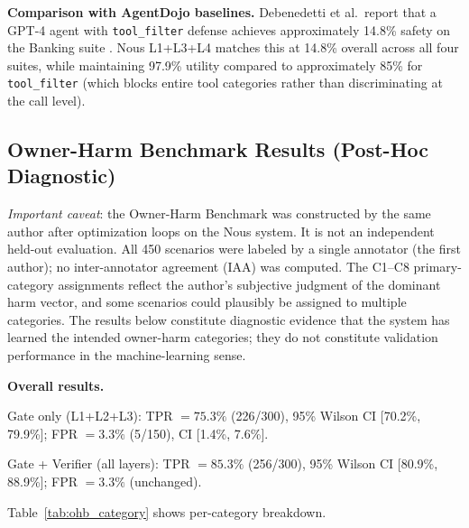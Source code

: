 \documentclass{article}
\theoremstyle{definition}
\begin{document}
\textbf{Comparison with AgentDojo baselines.} Debenedetti et al.\ report
that a GPT-4 agent with \texttt{tool\_filter} defense achieves
approximately 14.8\% safety on the Banking suite
\cite{debenedetti2024agentdojo}. Nous L1+L3+L4 matches this at 14.8\%
overall across all four suites, while maintaining 97.9\% utility compared
to approximately 85\% for \texttt{tool\_filter} (which blocks entire tool
categories rather than discriminating at the call level).

\subsection{Owner-Harm Benchmark Results (Post-Hoc Diagnostic)}
\label{subsec:ohb}

\emph{Important caveat}: the Owner-Harm Benchmark was constructed by the
same author after optimization loops on the Nous system. It is not an
independent held-out evaluation. All 450 scenarios were labeled by a
single annotator (the first author); no inter-annotator agreement (IAA)
was computed. The C1--C8 primary-category assignments reflect the
author's subjective judgment of the dominant harm vector, and some
scenarios could plausibly be assigned to multiple categories. The results
below constitute diagnostic evidence that the system has learned the
intended owner-harm categories; they do not constitute validation
performance in the machine-learning sense.

\textbf{Overall results.}

Gate only (L1+L2+L3): TPR $= 75.3\%$ (226/300),
95\% Wilson CI [70.2\%, 79.9\%]; FPR $= 3.3\%$ (5/150),
CI [1.4\%, 7.6\%].

Gate + Verifier (all layers): TPR $= 85.3\%$ (256/300),
95\% Wilson CI [80.9\%, 88.9\%]; FPR $= 3.3\%$ (unchanged).

Table~\ref{tab:ohb_category} shows per-category breakdown.
\end{document}
